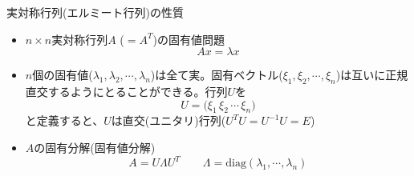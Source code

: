\begin{frame}[t,fragile]{実対称行列(エルミート行列)の性質}
  \begin{itemize}
  \item $n \times n$実対称行列$A$ ($=A^T$)の固有値問題
    \[
    A x = \lambda x
    \]
  \item $n$個の固有値($\lambda_1,\lambda_2,\cdots,\lambda_n$)は全て実。固有ベクトル($\xi_1,\xi_2,\cdots,\xi_n$)は互いに正規直交するようにとることができる。行列$U$を
    \[
    U = \Big( \xi_1 \, \xi_2 \, \cdots \, \xi_n \Big)
    \]
    と定義すると、$U$は直交(ユニタリ)行列($U^T U = U^{-1} U = E$)
  \item $A$の固有分解(固有値分解)
    \[
    A = U \Lambda U^T \qquad \Lambda = \text{diag}(\lambda_1,\cdots,\lambda_n)
    \]
  \end{itemize}
\end{frame}
